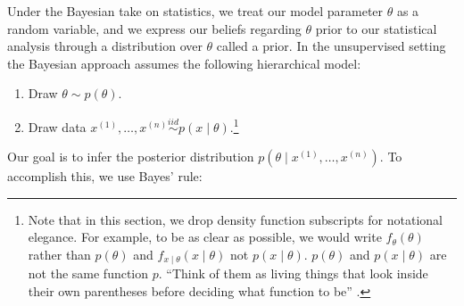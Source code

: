 

Under the Bayesian take on statistics, we treat our model parameter $\theta$ as a random variable, and we express our beliefs regarding $\theta$ prior to our statistical analysis through a distribution over $\theta$ called a prior. In the unsupervised setting the Bayesian approach assumes the following hierarchical model:
\begin{enumerate}
    \item Draw $\theta \sim p(\theta)$.
    \item Draw data $x^{(1)}, \dots, x^{(n)} \overset{iid}\sim p(x \mid \theta)$.\footnote{Note that in this section, we drop density function subscripts for notational elegance. For example, to be as clear as possible, we would write $f_\theta(\theta)$ rather than $p(\theta)$ and $f_{x \mid \theta}(x \mid \theta)$ not $p(x \mid \theta)$. $p(\theta)$ and $p(x \mid \theta)$ are not the same function $p$. ``Think of them as living things that look inside their own parentheses before deciding what function to be'' \cite{owen_lecture_2018}.}
\end{enumerate}
Our goal is to infer the posterior distribution $p\left(\theta \mid x^{(1)}, \dots, x^{(n)}\right)$. To accomplish this, we use Bayes' rule:

